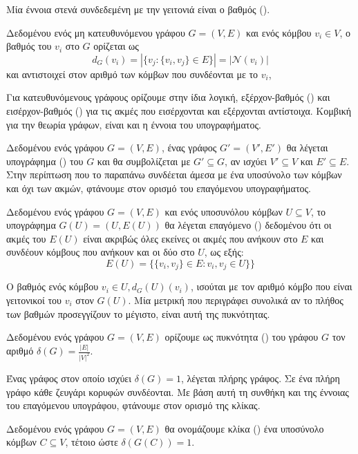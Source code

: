 Μία έννοια στενά συνδεδεμένη με την γειτονιά είναι ο βαθμός ().
\begin{definition}[Βαθμός]
Δεδομένου ενός μη κατευθυνόμενου γράφου $G = ( V, E )$ και ενός κόμβου $v_{i} \in V$, ο βαθμός του $v_{i}$ στο $G$ ορίζεται ως $$d_{G} ( v_{i} ) = |\{ v_{j} : \{ v_{i} , v_{j} \} \in E \}| = |\mathcal{N} ( v_{i} )|$$ και αντιστοιχεί στον αριθμό των κόμβων που συνδέονται με το $v_{i}$,
\end{definition}
Για κατευθυνόμενους γράφους ορίζουμε στην ίδια λογική, εξέρχον-βαθμός () και εισέρχον-βαθμός () για τις ακμές που εισέρχονται και εξέρχονται αντίστοιχα.
Κομβική για την θεωρία γράφων, είναι και η έννοια του υπογραφήματος.
\begin{definition}[Υπογράφημα]
Δεδομένου ενός γράφου $G = ( V, E )$, ένας γράφος $G' = ( V', E')$ θα λέγεται υπογράφημα () του $G$ και θα συμβολίζεται με $G' \subseteq G$, αν ισχύει $V' \subseteq V$ και $E' \subseteq E$.
\label{def:subgraph}
Στην περίπτωση που το παραπάνω συνδέεται άμεσα με ένα υποσύνολο των κόμβων και όχι των ακμών, φτάνουμε στον ορισμό του επαγόμενου υπογραφήματος.
\end{definition}
\begin{definition}
Δεδομένου ενός γράφου $G = ( V, E )$ και ενός υποσυνόλου κόμβων $U \subseteq V$, το υπογράφημα $G(U) = (U, E(U))$ θα λέγεται επαγόμενο () δεδομένου ότι οι ακμές του $E(U)$ είναι ακριβώς όλες εκείνες οι ακμές που ανήκουν στο $E$ και συνδέουν κόμβους που ανήκουν και οι δύο στο $U$, ως εξής:
\begin{equation}
    E(U) = \{\{v_{i},v_{j}\}\in E: v_{i}, v_{j}\in U\}\}
\end{equation}
\label{def:induced_subgraph}
\end{definition}
Ο βαθμός ενός κόμβου $v_{i} \in U, d_{G}(U)(v_{i})$, ισούται με τον αριθμό κόμβο που είναι γειτονικοί του $v_{i}$ στον $G(U)$.
Μία μετρική που περιγράφει συνολικά αν το πλήθος των βαθμών προσεγγίζουν το μέγιστο, είναι αυτή της πυκνότητας.
\begin{definition}[Πυκνότητα]
Δεδομένου ενός γράφου $G = ( V, E )$ ορίζουμε ως πυκνότητα () του γράφου $G$ τον αριθμό $\delta(G) = \frac{|E|}{|V|^{2}}$.
\end{definition}
Ένας γράφος στον οποίο ισχύει $\delta(G) = 1$, λέγεται πλήρης γράφος.
Σε ένα πλήρη γράφο κάθε ζευγάρι κορυφών συνδέονται.
Με βάση αυτή τη συνθήκη και της έννοιας του επαγόμενου υπογράφου, φτάνουμε στον ορισμό της κλίκας.
\begin{definition}[Κλίκα]
Δεδομένου ενός γράφου $G = ( V, E )$ θα ονομάζουμε κλίκα () ένα υποσύνολο κόμβων $C \subseteq V$, τέτοιο ώστε $\delta(G(C)) = 1$.
\end{definition}
